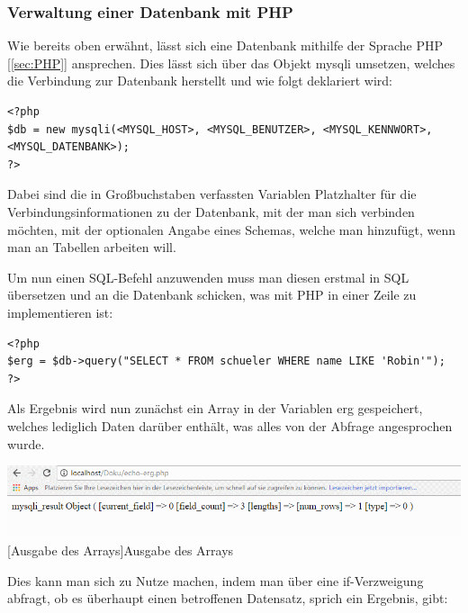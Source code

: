 \documentclass[12pt,a4paper,bibliography=totocnumbered,listof=totocnumbered]{scrartcl}
\begin{document}
\begin{minipage}{\linewidth}
\subsubsection{Verwaltung einer Datenbank mit PHP}
\label{sec:SQL-PHP}
Wie bereits oben erwähnt, lässt sich eine Datenbank mithilfe der Sprache PHP [\ref{sec:PHP}] ansprechen.
Dies lässt sich über das Objekt \glqq mysqli\grqq{} umsetzen, welches die Verbindung zur Datenbank herstellt und wie folgt deklariert wird:

\vspace{1em}
\begin{lstlisting}[caption= SQL PHP Mysqli, label=lst:sql-php-mysqli]
<?php
$db = new mysqli(<MYSQL_HOST>, <MYSQL_BENUTZER>, <MYSQL_KENNWORT>, <MYSQL_DATENBANK>);
?>
\end{lstlisting}

Dabei sind die in Großbuchstaben verfassten Variablen Platzhalter für die Verbindungsinformationen zu der Datenbank, mit der man sich verbinden möchten, mit der optionalen Angabe eines Schemas, welche man hinzufügt, wenn man an Tabellen arbeiten will.

Um nun einen SQL-Befehl anzuwenden muss man diesen erstmal in SQL übersetzen und an die Datenbank schicken, was mit PHP in einer Zeile zu implementieren ist:

\vspace{1em}
\begin{lstlisting}[caption= SQL PHP Mysqli, label=lst:sql-php-mysqli]
<?php
$erg = $db->query("SELECT * FROM schueler WHERE name LIKE 'Robin'");
?>
\end{lstlisting}

Als Ergebnis wird nun zunächst ein Array in der Variablen \glqq erg\grqq{} gespeichert, welches lediglich Daten darüber enthält, was alles von der Abfrage angesprochen wurde.

\vspace{1em}
\begin{minipage}{\linewidth}
	\centering
	\includegraphics[width=0.7\linewidth]{Bilder/sql-php-print-erg.png}
	[Ausgabe des Arrays]{Ausgabe des Arrays}
	\label{fig:arrayausgabe}
\end{minipage}


Dies kann man sich zu Nutze machen, indem man über eine if-Verzweigung abfragt, ob es überhaupt einen betroffenen Datensatz, sprich ein Ergebnis, gibt:


\end{minipage}
\end{document}
